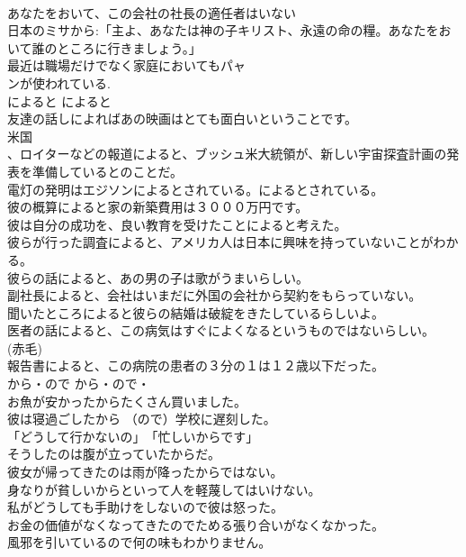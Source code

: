 \documentclass[8pt]{extreport}
\begin{document}
\begin{CJK}{UTF8}{min}
\\	あなたをおいて、この会社の社長の適任者はいない   
\\	日本のミサから:「主よ、あなたは神の子キリスト、永遠の命の糧。あなたをおいて誰のところに行きましょう。」  
\\	最近は職場だけでなく家庭においてもパャ
\\	ンが使われている. 
\\	によると	によると	
\\	友達の話しによればあの映画はとても面白いということです。  
\\	米国
\\	、ロイターなどの報道によると、ブッシュ米大統領が、新しい宇宙探査計画の発表を準備しているとのことだ。  
\\	電灯の発明はエジソンによるとされている。によるとされている。   
\\	彼の概算によると家の新築費用は３０００万円です。   
\\	彼は自分の成功を、良い教育を受けたことによると考えた。  
\\	彼らが行った調査によると、アメリカ人は日本に興味を持っていないことがわかる。   
\\	彼らの話によると、あの男の子は歌がうまいらしい。   
\\	副社長によると、会社はいまだに外国の会社から契約をもらっていない。   
\\	聞いたところによると彼らの結婚は破綻をきたしているらしいよ。   
\\	医者の話によると、この病気はすぐによくなるというものではないらしい。  
\\	(赤毛)
\\	報告書によると、この病院の患者の３分の１は１２歳以下だった。  
\\	から・ので	から・ので・	
\\	お魚が安かったからたくさん買いました。  
\\	彼は寝過ごしたから （ので）学校に遅刻した。   
\\	「どうして行かないの」　「忙しいからです」   
\\	そうしたのは腹が立っていたからだ。   
\\	彼女が帰ってきたのは雨が降ったからではない。   
\\	身なりが貧しいからといって人を軽蔑してはいけない。   
\\	私がどうしても手助けをしないので彼は怒った。   
\\	お金の価値がなくなってきたのでためる張り合いがなくなかった。   
\\	風邪を引いているので何の味もわかりません。   

\end{CJK}
\end{document}
